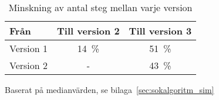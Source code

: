         \begin{table}[hb]
            \caption{\label{tab:algoritm_forbattring}Minskning av antal steg mellan varje version}
            \centering
            \begin{threeparttable}
            \begin{tabular}{@{}lcc@{}}
            \toprule
            Från        & \multicolumn{1}{l}{Till version 2} & \multicolumn{1}{l}{Till version 3} \\ \midrule
            Version 1 & 14~\%                                & 51~\%                                \\
            Version 2 & -                                    & 43~\% \\ \bottomrule
            \end{tabular}
            \begin{tablenotes}
            \item Baserat på medianvärden, se bilaga~\ref{sec:sokalgoritm_sim}
        \end{tablenotes}
        \end{threeparttable}
        \end{table}

